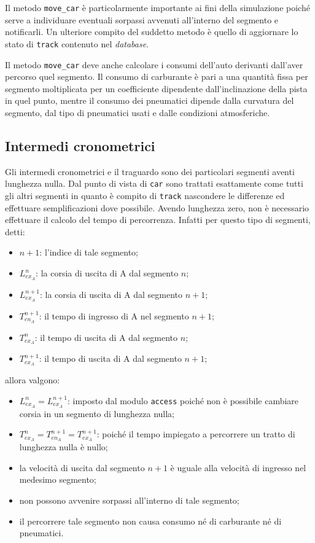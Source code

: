 \documentclass[a4paper]{report}
\newcommand{\fun}[1]{\texttt{#1}}
\begin{document}
Il metodo \fun{move\_car} è particolarmente importante ai fini della simulazione poiché serve a individuare eventuali sorpassi avvenuti all'interno del segmento e notificarli. Un ulteriore compito del suddetto metodo è quello di aggiornare lo stato di \texttt{track} contenuto nel \textit{database}.

Il metodo \fun{move\_car} deve anche calcolare i consumi dell'auto derivanti dall'aver percorso quel segmento.
Il consumo di carburante è pari a una quantità fissa per segmento moltiplicata per un coefficiente dipendente dall'inclinazione della pista in quel punto, mentre il consumo dei pneumatici dipende dalla curvatura del segmento, dal tipo di pneumatici usati e dalle condizioni atmosferiche.

\subsection{Intermedi cronometrici}
Gli intermedi cronometrici e il traguardo sono dei particolari segmenti aventi lunghezza nulla. Dal punto di vista di \texttt{car} sono trattati esattamente come tutti gli altri segmenti in quanto è compito di \texttt{track} nascondere le differenze ed effettuare semplificazioni dove possibile. Avendo lunghezza zero, non è necessario effettuare il calcolo del tempo di percorrenza. Infatti per questo tipo di segmenti, detti:
\begin{itemize}
\item $n+1$: l'indice di tale segmento;
\item $L_{ex_A}^{n}$: la corsia di uscita di A dal segmento $n$;
\item $L_{ex_A}^{n+1}$: la corsia di uscita di A dal segmento $n+1$;
\item $T_{en_A}^{n+1}$: il tempo di ingresso di A nel segmento $n+1$;
\item $T_{ex_A}^{n}$: il tempo di uscita di A dal segmento $n$;
\item $T_{ex_A}^{n+1}$: il tempo di uscita di A dal segmento $n+1$;
\end{itemize}
allora valgono:
\begin{itemize}
\item $L_{ex_A}^{n} = L_{ex_A}^{n+1}$: imposto dal modulo \texttt{access} poiché non è possibile cambiare corsia in un segmento di lunghezza nulla;
\item $T_{ex_A}^{n} = T_{en_A}^{n+1} = T_{ex_A}^{n+1}$: poiché il tempo impiegato a percorrere un tratto di lunghezza nulla è nullo;
\item la velocità di uscita dal segmento $n+1$ è uguale alla velocità di ingresso nel medesimo segmento;
\item non possono avvenire sorpassi all'interno di tale segmento;
\item il percorrere tale segmento non causa consumo né di carburante né di pneumatici.
\end{itemize}
\end{document}
